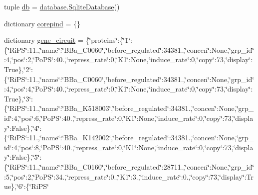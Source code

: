 \begin{DoxyCompactItemize}
\item 
tuple \hyperlink{namespaceweb_1_1_simulate___function_aa6287cbf61a8af0085b4f12a1dd76ea4}{db} = \hyperlink{classweb_1_1database_1_1_sqlite_database}{database.\-Sqlite\-Database}()
\item 
dictionary \hyperlink{namespaceweb_1_1_simulate___function_a81c5f255dec55bf662a9efb5d21ed85d}{corepind} = \{\}
\item 
dictionary \hyperlink{namespaceweb_1_1_simulate___function_a457ef517e113fcce96844b1789700e8c}{gene\-\_\-circuit} = \{\char`\"{}proteins\char`\"{}\-:\{\char`\"{}1\char`\"{}\-:\{\char`\"{}Ri\-P\-S\char`\"{}\-:11.,\char`\"{}name\char`\"{}\-:\char`\"{}B\-Ba\-\_\-\-C0060\char`\"{},\char`\"{}before\-\_\-regulated\char`\"{}\-:34381.,\char`\"{}concen\char`\"{}\-:None,\char`\"{}grp\-\_\-id\char`\"{}\-:4,\char`\"{}pos\char`\"{}\-:2,\char`\"{}Po\-P\-S\char`\"{}\-:40.,\char`\"{}repress\-\_\-rate\char`\"{}\-:0,\char`\"{}K1\char`\"{}\-:None,\char`\"{}induce\-\_\-rate\char`\"{}\-:0,\char`\"{}copy\char`\"{}\-:73,\char`\"{}display\char`\"{}\-:True\},\char`\"{}2\char`\"{}\-:\{\char`\"{}Ri\-P\-S\char`\"{}\-:11.,\char`\"{}name\char`\"{}\-:\char`\"{}B\-Ba\-\_\-\-C0060\char`\"{},\char`\"{}before\-\_\-regulated\char`\"{}\-:34381.,\char`\"{}concen\char`\"{}\-:None,\char`\"{}grp\-\_\-id\char`\"{}\-:4,\char`\"{}pos\char`\"{}\-:4,\char`\"{}Po\-P\-S\char`\"{}\-:40.,\char`\"{}repress\-\_\-rate\char`\"{}\-:0,\char`\"{}K1\char`\"{}\-:None,\char`\"{}induce\-\_\-rate\char`\"{}\-:0,\char`\"{}copy\char`\"{}\-:73,\char`\"{}display\char`\"{}\-:True\},\char`\"{}3\char`\"{}\-:\{\char`\"{}Ri\-P\-S\char`\"{}\-:11.,\char`\"{}name\char`\"{}\-:\char`\"{}B\-Ba\-\_\-\-K518003\char`\"{},\char`\"{}before\-\_\-regulated\char`\"{}\-:34381.,\char`\"{}concen\char`\"{}\-:None,\char`\"{}grp\-\_\-id\char`\"{}\-:4,\char`\"{}pos\char`\"{}\-:6,\char`\"{}Po\-P\-S\char`\"{}\-:40.,\char`\"{}repress\-\_\-rate\char`\"{}\-:0,\char`\"{}K1\char`\"{}\-:None,\char`\"{}induce\-\_\-rate\char`\"{}\-:0,\char`\"{}copy\char`\"{}\-:73,\char`\"{}display\char`\"{}\-:False\},\char`\"{}4\char`\"{}\-:\{\char`\"{}Ri\-P\-S\char`\"{}\-:11.,\char`\"{}name\char`\"{}\-:\char`\"{}B\-Ba\-\_\-\-K142002\char`\"{},\char`\"{}before\-\_\-regulated\char`\"{}\-:34381.,\char`\"{}concen\char`\"{}\-:None,\char`\"{}grp\-\_\-id\char`\"{}\-:4,\char`\"{}pos\char`\"{}\-:8,\char`\"{}Po\-P\-S\char`\"{}\-:40.,\char`\"{}repress\-\_\-rate\char`\"{}\-:0,\char`\"{}K1\char`\"{}\-:None,\char`\"{}induce\-\_\-rate\char`\"{}\-:0,\char`\"{}copy\char`\"{}\-:73,\char`\"{}display\char`\"{}\-:False\},\char`\"{}5\char`\"{}\-:\{\char`\"{}Ri\-P\-S\char`\"{}\-:11.,\char`\"{}name\char`\"{}\-:\char`\"{}B\-Ba\-\_\-\-C0160\char`\"{},\char`\"{}before\-\_\-regulated\char`\"{}\-:28711.,\char`\"{}concen\char`\"{}\-:None,\char`\"{}grp\-\_\-id\char`\"{}\-:5,\char`\"{}pos\char`\"{}\-:2,\char`\"{}Po\-P\-S\char`\"{}\-:34.,\char`\"{}repress\-\_\-rate\char`\"{}\-:0.,\char`\"{}K1\char`\"{}\-:3.,\char`\"{}induce\-\_\-rate\char`\"{}\-:0.,\char`\"{}copy\char`\"{}\-:73,\char`\"{}display\char`\"{}\-:True\},\char`\"{}6\char`\"{}\-:\{\char`\"{}Ri\-P\-S\char`\"
\end{DoxyCompactItemize}
